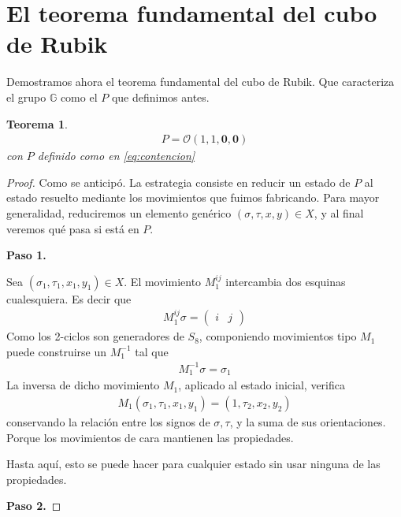 \documentclass{article}
\newtheorem{teorema}{Teorema}[section]
\theoremstyle{definition}
\newcommand{\G}{\mathbb{G}}
\begin{document}
\section{El teorema fundamental del cubo de Rubik}
Demostramos ahora el teorema fundamental del cubo de Rubik. Que caracteriza el grupo $\G$ como el $P$ que definimos antes.
\begin{teorema}
    \begin{align*}
        P=\mathcal{O}(1,1,\mathbf{0},\mathbf{0})
    \end{align*}
    con $P$ definido como en \eqref{eq:contencion}
\end{teorema}
\begin{proof}
    Como se anticipó. La estrategia consiste en reducir un estado de $P$ al estado resuelto mediante los movimientos que fuimos fabricando. Para mayor generalidad, reduciremos un elemento genérico $(\sigma,\tau,x,y)\in X$, y al final veremos qué pasa si está en $P$.

    \noindent\textbf{Paso 1.}

    Sea $(\sigma_1,\tau_1,x_1,y_1)\in X$. El movimiento $M^{ij}_1$ intercambia dos esquinas cualesquiera. Es decir que
    \begin{align*}
        M_1^{ij}\sigma=\begin{pmatrix}
                           i & j
                       \end{pmatrix}
    \end{align*}
    Como los 2-ciclos son generadores de $S_8$, componiendo movimientos tipo $M_1$ puede construirse un $M_1^{-1}$ tal que
    \begin{align*}
        M_1^{-1}\sigma=\sigma_1
    \end{align*}
    La inversa de dicho movimiento $M_1$, aplicado al estado inicial, verifica
    \begin{align*}
        M_1(\sigma_1,\tau_1,x_1,y_1)=(1,\tau_2,x_2,y_2)
    \end{align*}
    conservando la relación entre los signos de $\sigma,\tau$, y la suma de sus orientaciones. Porque los movimientos de cara mantienen las propiedades.

    Hasta aquí, esto se puede hacer para cualquier estado sin usar ninguna de las propiedades.
    
    \noindent\textbf{Paso 2.}


\end{proof}
\end{document}
